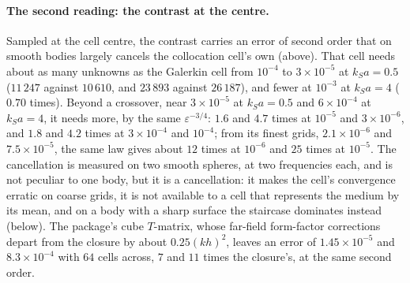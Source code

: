 \documentclass[11pt,a4paper]{article}
\begin{document}
\paragraph{The second reading: the contrast at the centre.} Sampled at the cell centre, the contrast
carries an error of second order that on smooth bodies largely cancels the collocation cell's own
(above). That cell needs about as many unknowns as the Galerkin cell from $10^{-4}$ to $3\times10^{-5}$ at
$k_Sa=0.5$ ($11\,247$ against $10\,610$, and $23\,893$ against $26\,187$), and fewer at $10^{-3}$ at
$k_Sa=4$ ($0.70$ times). Beyond a crossover, near $3\times10^{-5}$ at $k_Sa=0.5$ and $6\times10^{-4}$ at
$k_Sa=4$, it needs more, by the same $\varepsilon^{-3/4}$: $1.6$ and $4.7$ times at $10^{-5}$ and
$3\times10^{-6}$, and $1.8$ and $4.2$ times at $3\times10^{-4}$ and $10^{-4}$; from its finest grids,
$2.1\times10^{-6}$ and $7.5\times10^{-5}$, the same law gives about $12$ times at $10^{-6}$ and $25$ times
at $10^{-5}$. The cancellation is measured on two smooth spheres, at two frequencies each, and is not
peculiar to one body, but it is a cancellation: it makes the cell's convergence erratic on coarse grids,
it is not available to a cell that represents the medium by its mean, and on a body with a sharp surface
the staircase dominates instead (below). The package's cube $T$-matrix, whose far-field form-factor
corrections depart from the closure by about $0.25(kh)^2$, leaves an error of $1.45\times10^{-5}$ and
$8.3\times10^{-4}$ with $64$ cells across, $7$ and $11$ times the closure's, at the same second order.
\end{document}
